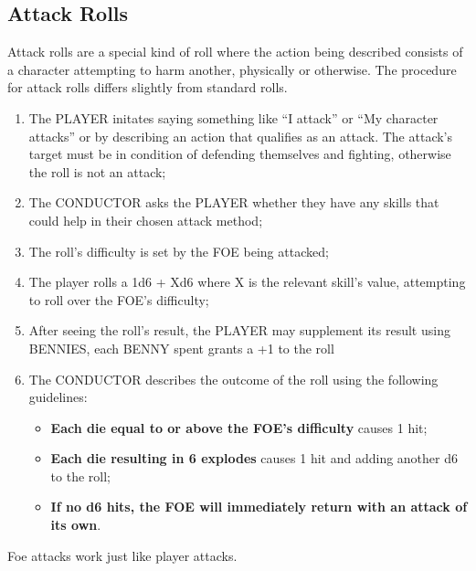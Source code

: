 \subsection{Attack Rolls}
Attack rolls are a special kind of roll where the action being described consists of a character attempting to harm another, physically or otherwise. The procedure for attack rolls differs slightly from standard rolls.
\begin{enumerate}
    \item {The PLAYER initates saying something like ``I attack'' or ``My character attacks'' or by describing an action that qualifies as an attack. The attack's target must be in condition of defending themselves and fighting, otherwise the roll is not an attack;}
    \item {The CONDUCTOR asks the PLAYER whether they have any skills that could help in their chosen attack method;}
    \item {The roll's difficulty is set by the FOE being attacked;}
    \item {The player rolls a 1d6 + Xd6 where X is the relevant skill's value, attempting to roll over the FOE's difficulty;}
    \item {After seeing the roll's result, the PLAYER may supplement its result using BENNIES, each BENNY spent grants a +1 to the roll}
    \item {The CONDUCTOR describes the outcome of the roll using the following guidelines:}
    \begin{itemize}
        \item {\textbf{Each die equal to or above the FOE's difficulty} causes 1 hit;}
        \item {\textbf{Each die resulting in 6 explodes} causes 1 hit and adding another d6 to the roll;}
        \item {\textbf{If no d6 hits, the FOE will immediately return with an attack of its own}.}
    \end{itemize}
\end{enumerate}
Foe attacks work just like player attacks.